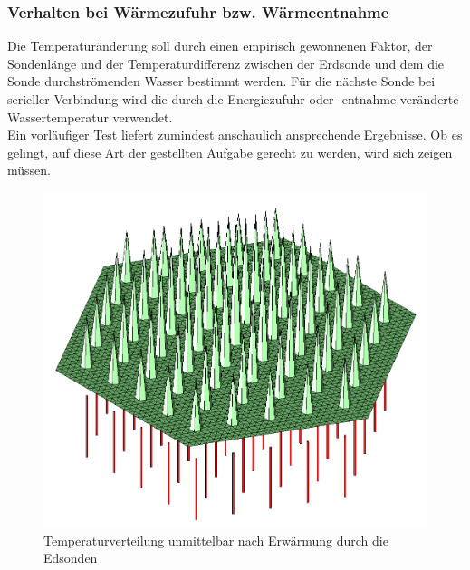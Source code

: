 \documentclass[12pt,a4paper]{article}
\begin{document}
\subsubsection{Verhalten bei Wärmezufuhr bzw. Wärmeentnahme} 
Die Temperaturänderung soll durch einen empirisch gewonnenen Faktor, der Sondenlänge und der Temperaturdifferenz zwischen der Erdsonde und dem die Sonde durchströmenden Wasser bestimmt werden. Für die nächste Sonde bei serieller Verbindung wird die durch die Energiezufuhr oder -entnahme veränderte Wassertemperatur verwendet.\\
Ein vorläufiger Test liefert zumindest anschaulich ansprechende Ergebnisse. Ob es gelingt, auf diese Art der gestellten Aufgabe gerecht zu werden, wird sich zeigen müssen.
\begin{figure}[h]
    \begin{minipage}[t]{.4\linewidth} %
       \includegraphics[width=\linewidth]{TempAt0.png}
       \caption{Temperaturverteilung unmittelbar nach Erwärmung durch die Edsonden}
       \label{TempAt0}
    \end{minipage}
    \hspace{.1\linewidth}%
    \begin{minipage}[t]{.4\linewidth} %

\end{minipage}
\end{figure}
\end{document}
